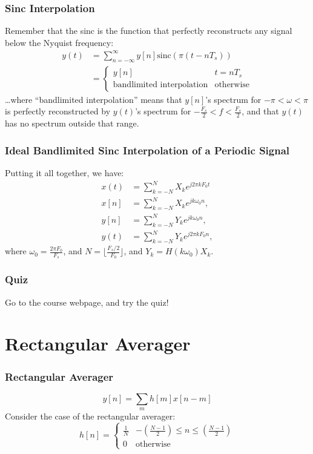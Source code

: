 \documentclass{beamer}
\begin{document}
\begin{frame}
  \frametitle{Sinc Interpolation}

  Remember that the sinc is the function that perfectly reconstructs
  any signal below the Nyquist frequency:
  \begin{align*}
    y(t) &= \sum_{n=-\infty}^{\infty}y[n] \text{sinc}\left(\pi(t-nT_s)\right)\\
    &=\begin{cases}y[n]&t=nT_s\\
    \text{bandlimited interpolation}&\text{otherwise}\end{cases}
  \end{align*}
  \ldots where ``bandlimited interpolation'' means that $y[n]$'s
  spectrum for $-\pi<\omega<\pi$ is perfectly reconstructed by
  $y(t)$'s spectrum for $-\frac{F_s}{2}<f<\frac{F_s}{2}$, and that
  $y(t)$ has no spectrum outside that range.
\end{frame}

\begin{frame}
  \frametitle{Ideal Bandlimited Sinc Interpolation of a Periodic Signal}

  Putting it all together, we have:
  \begin{align*}
    x(t)&=\sum_{k=-N}^{N}X_ke^{j2\pi kF_0t}\\
    x[n]&=\sum_{k=-N}^{N}X_ke^{jk\omega_0n},\\
    y[n]&=\sum_{k=-N}^{N}Y_ke^{jk\omega_0n},\\
    y(t)&=\sum_{k=-N}^{N}Y_ke^{j2\pi kF_0n},
  \end{align*}
  where $\omega_0=\frac{2\pi F_0}{F_s}$, and
  $N=\lfloor\frac{F_s/2}{F_0}\rfloor$, and $Y_k=H(k\omega_0)X_k$.
\end{frame}

\begin{frame}
  \frametitle{Quiz}

  Go to the course webpage, and try the quiz!
\end{frame}

\section{Rectangular Averager}
\setcounter{subsection}{1}

\begin{frame}
  \frametitle{Rectangular Averager}

  \begin{displaymath}
    y[n]=\sum_m h[m]x[n-m]
  \end{displaymath}
  Consider the case of the rectangular averager:
  \begin{displaymath}
    h[n]=\left\{\begin{array}{ll}
    \frac{1}{N} & -\left(\frac{N-1}{2}\right)\le n\le \left(\frac{N-1}{2}\right)\\
    0 & \mbox{otherwise}
    \end{array}\right.
  \end{displaymath}
\end{frame}
\end{document}
